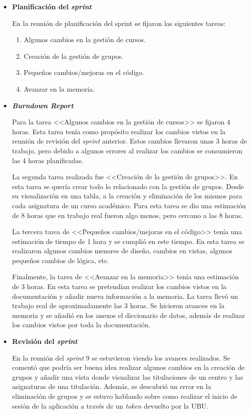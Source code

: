 \begin{itemize}
\item\textbf{Planificación del \textit{sprint}}


En la reunión de planificación del sprint se fijaron las siguientes tareas:
\begin{enumerate}
		\item Algunos cambios en la gestión de cursos.
		\item Creación de la gestión de grupos.
		\item Pequeños cambios/mejoras en el código.
		\item Avanzar en la memoria.
\end{enumerate}

\item\textbf{\textit{Burndown Report}}

Para la tarea <<Algunos cambios en la gestión de cursos>> se fijaron 4 horas. 
Esta tarea tenía como propósito realizar los cambios vistos en la reunión de revisión del \textit{sprint} anterior.
Estos cambios llevaron unas 3 horas de trabajo, pero debido a algunos errores al realizar los cambios se consumieron las 4 horas planificadas.

La segunda tarea realizada fue <<Creación de la gestión de grupos>>.
En esta tarea se quería crear todo lo relacionado con la gestión de grupos.
Desde su visualización en una tabla, a la creación y eliminación de los mismos para cada asignatura de un curso académico.
Para esta tarea se dio una estimación de 8 horas que en trabajo real fueron algo menos, pero cercano a las 8 horas.

La tercera tarea de <<Pequeños cambios/mejoras en el código>> tenía una estimación de tiempo de 1 hora y se cumplió en este tiempo.
En esta tarea se realizaron algunos cambios menores de diseño, cambios en vistas, algunos pequeños cambios de lógica, etc.

Finalmente, la tarea de <<Avanzar en la memoria>> tenía una estimación de 3 horas.
En esta tarea se pretendían realizar los cambios vistos en la documentación y añadir nueva información a la memoria.
La tarea llevó un trabajo real de aproximadamente las 3 horas. Se hicieron avances en la memoria y se añadió en los anexos el diccionario de datos, además de realizar los cambios vistos por toda la documentación.

\item\textbf{Revisión del \textit{sprint}}

En la reunión del \textit{sprint} 9 se estuvieron viendo los avances realizados. Se comentó que podría ser buena idea realizar algunos cambios en la creación de grupos y añadir una vista donde visualizar las titulaciones de un centro y las asignaturas de una titulación. Además, se descubrió un error en la eliminación de grupos y se estuvo hablando sobre como realizar el inicio de sesión de la aplicación a través de un \textit{token} devuelto por la UBU.
\end{itemize}

